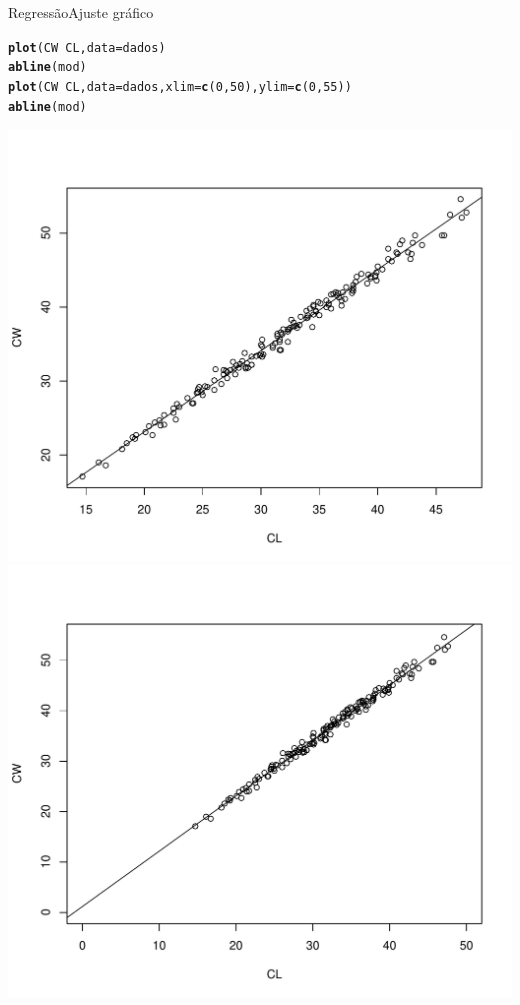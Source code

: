 \documentclass[10pt]{beamer}\usepackage[]{graphicx}\usepackage[]{color}
\makeatletter
\newcommand{\hlnum}[1]{\textcolor[rgb]{0.686,0.059,0.569}{#1}}%
\newcommand{\hlopt}[1]{\textcolor[rgb]{0,0,0}{#1}}%
\newcommand{\hlstd}[1]{\textcolor[rgb]{0.345,0.345,0.345}{#1}}%
\newcommand{\hlkwc}[1]{\textcolor[rgb]{0.333,0.667,0.333}{#1}}%
\newcommand{\hlkwd}[1]{\textcolor[rgb]{0.737,0.353,0.396}{\textbf{#1}}}%
\newenvironment{kframe}{%
 \def\at@end@of@kframe{}%
 \ifinner\ifhmode%
  \def\at@end@of@kframe{\end{minipage}}%
  \begin{minipage}{\columnwidth}%
 \fi\fi%
 \def\FrameCommand##1{\hskip\@totalleftmargin \hskip-\fboxsep
 \colorbox{shadecolor}{##1}\hskip-\fboxsep
     \hskip-\linewidth \hskip-\@totalleftmargin \hskip\columnwidth}%
 \MakeFramed {\advance\hsize-\width
   \@totalleftmargin\z@ \linewidth\hsize
   \@setminipage}}%
 {\par\unskip\endMakeFramed%
 \at@end@of@kframe}
\newenvironment{knitrout}{}{} %
\theoremstyle{definition}
\makeatother
\begin{document}
\begin{frame}[fragile]{Regressão}{Ajuste gráfico}
\begin{knitrout}\footnotesize
{}\color{fgcolor}\begin{kframe}
\begin{alltt}
\hlkwd{plot}\hlstd{(CW} \hlopt{~} \hlstd{CL,} \hlkwc{data} \hlstd{= dados)}
\hlkwd{abline}\hlstd{(mod)}
\hlkwd{plot}\hlstd{(CW} \hlopt{~} \hlstd{CL,} \hlkwc{data} \hlstd{= dados,} \hlkwc{xlim} \hlstd{=} \hlkwd{c}\hlstd{(}\hlnum{0}\hlstd{,}\hlnum{50}\hlstd{),} \hlkwc{ylim} \hlstd{=} \hlkwd{c}\hlstd{(}\hlnum{0}\hlstd{,}\hlnum{55}\hlstd{))}
\hlkwd{abline}\hlstd{(mod)}
\end{alltt}
\end{kframe}

{\centering \includegraphics[width=.49\textwidth]{figure/unnamed-chunk-13-1} 
\includegraphics[width=.49\textwidth]{figure/unnamed-chunk-13-2} 

}



\end{knitrout}
\end{frame}
\end{document}
